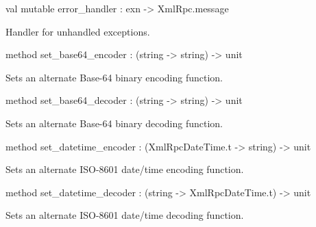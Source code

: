 \documentclass[11pt]{article}
\begin{document}
\begin{ocamldocobjectend}
\begin{ocamldocdescription}
\end{ocamldocdescription}


\label{val:XmlRpcServer.base.error-underscorehandler}\begin{ocamldoccode}
val mutable error_handler : exn -> XmlRpc.message
\end{ocamldoccode}
\begin{ocamldocdescription}
Handler for unhandled exceptions.


\end{ocamldocdescription}


\label{method:XmlRpcServer.base.set-underscorebase64-underscoreencoder}\begin{ocamldoccode}
method set_base64_encoder : (string -> string) -> unit
\end{ocamldoccode}
\begin{ocamldocdescription}
Sets an alternate Base-64 binary encoding function.


\end{ocamldocdescription}


\label{method:XmlRpcServer.base.set-underscorebase64-underscoredecoder}\begin{ocamldoccode}
method set_base64_decoder : (string -> string) -> unit
\end{ocamldoccode}
\begin{ocamldocdescription}
Sets an alternate Base-64 binary decoding function.


\end{ocamldocdescription}


\label{method:XmlRpcServer.base.set-underscoredatetime-underscoreencoder}\begin{ocamldoccode}
method set_datetime_encoder : (XmlRpcDateTime.t -> string) -> unit
\end{ocamldoccode}
\begin{ocamldocdescription}
Sets an alternate ISO-8601 date/time encoding function.


\end{ocamldocdescription}


\label{method:XmlRpcServer.base.set-underscoredatetime-underscoredecoder}\begin{ocamldoccode}
method set_datetime_decoder : (string -> XmlRpcDateTime.t) -> unit
\end{ocamldoccode}
\begin{ocamldocdescription}
Sets an alternate ISO-8601 date/time decoding function.



\end{ocamldocdescription}
\end{ocamldocobjectend}
\end{document}
